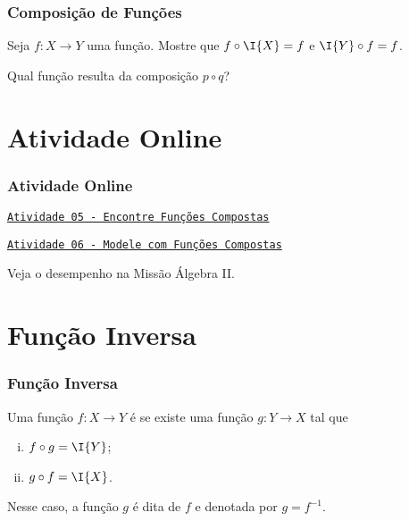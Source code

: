 \documentclass[brazil, notheorems, 10pt]{beamer}
\begin{document}
\begin{frame}
\frametitle{Composição de Funções} %

\begin{Exem}
Seja $f: X \to Y$ uma função. Mostre que $f \circ \I{X} = f$ e $\I{Y}
\circ f = f$.
\end{Exem}\pause

\begin{Exem}
Qual função resulta da composição $p \circ q$?
\end{Exem}
\end{frame}

\section{Atividade Online}
\begin{frame}
\frametitle{Atividade Online} %

\href{https://pt.khanacademy.org/math/algebra2/manipulating-functions/function-composition/e/compose-functions}
{{\tt Atividade 05 - Encontre Funções Compostas}}

\href{https://pt.khanacademy.org/math/algebra2/manipulating-functions/combining-and-composing-modeling-functions/e/modeling-with-composite-functions}
{{\tt Atividade 06 - Modele com Funções Compostas}}


Veja o desempenho na Missão Álgebra II.


\end{frame}



\section{Função Inversa}
\begin{frame}
\frametitle{Função Inversa} %

\begin{Def}\label{funinv}
Uma função $f: X \to Y$ é  se existe uma função $g:
Y \to X$ tal que
\begin{enumerate}[(i)]
	\item $f \circ g = \I{Y}$;
	\item $g \circ f = \I{X}$.
\end{enumerate}
Nesse caso, a função $g$ é dita  de $f$ e
denotada por $g = f^{-1}$.
\end{Def}

\end{frame}
\end{document}
